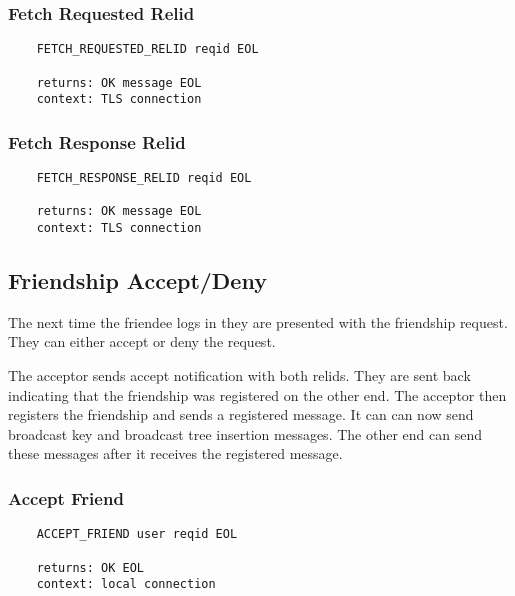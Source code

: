 \documentclass[letterpaper,11pt,oneside]{article}
\begin{document}
\subsubsection{Fetch Requested Relid}

\vspace{10pt}
\begin{verbatim}
    FETCH_REQUESTED_RELID reqid EOL

    returns: OK message EOL
    context: TLS connection
\end{verbatim}
\vspace{10pt}

\subsubsection{Fetch Response Relid}

\vspace{10pt}
\begin{verbatim}
    FETCH_RESPONSE_RELID reqid EOL

    returns: OK message EOL
    context: TLS connection
\end{verbatim}

\subsection{Friendship Accept/Deny}

The next time the friendee logs in they are presented with the friendship
request. They can either accept or deny the request. 

The acceptor sends accept notification with both relids. They are sent back
indicating that the friendship was registered on the other end. The acceptor
then registers the friendship and sends a registered message. It can can now
send broadcast key and broadcast tree insertion messages. The other end can
send these messages after it receives the registered message.

\subsubsection{Accept Friend}

\vspace{10pt}
\begin{verbatim}
    ACCEPT_FRIEND user reqid EOL

    returns: OK EOL
    context: local connection
\end{verbatim}
\vspace{10pt}
\end{document}
